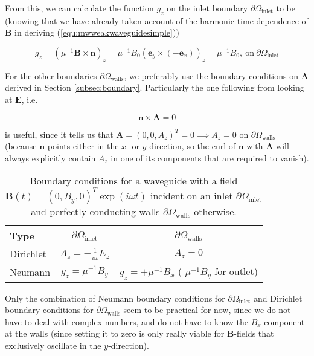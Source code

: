 \documentclass[11pt, a4paper]{article}
\begin{document}
From this, we can calculate the function $g_z$ on the inlet boundary $\partial \Omega_{\text{inlet}}$ to be 
(knowing that we have already taken account of the harmonic time-dependence of 
$\mathbf{B}$ in deriving (\ref{equ:mwweakwaveguidesimple}))

\begin{equation}
    g_z = (\mu^{-1} \mathbf{B} \times \mathbf{n})_z = \mu^{-1} B_0 (\mathbf{e}_y \times (-\mathbf{e}_x))_z = \mu^{-1} B_0, ~\text{on}~\partial \Omega_{\text{inlet}}
\end{equation}

For the other boundaries $\partial \Omega_{\text{walls}}$, we preferably use the boundary
conditions on $\mathbf{A}$ derived in Section \ref{subsec:boundary}. Particularly 
the one following from looking at $\mathbf{E}$, i.e.

\begin{equation}
    \mathbf{n} \times \mathbf{A} = 0
\end{equation}

is useful, since it tells us that $\mathbf{A} = (0, 0, A_z)^T = 0 \implies A_z = 0$
on $\partial \Omega_{\text{walls}}$ (because $\mathbf{n}$ points either in the $x$- or
$y$-direction, so the curl of $\mathbf{n}$ with $\mathbf{A}$ will always explicitly 
contain $A_z$ in one of its components that are required to vanish).

\begin{table}[h]
    \caption{Boundary conditions for a waveguide with a field $\mathbf{B}(t) = (0, B_y, 0)^T \exp(i \omega t)$
    incident on an inlet $\partial \Omega_{\text{inlet}}$ and perfectly conducting 
    walls  $\partial \Omega_{\text{walls}}$ otherwise.}
    \label{tab:label}
    \centering
    \renewcommand{\arraystretch}{1.2}
    \begin{tabular}{@{}lcc@{}}
        \toprule
        Type & $\partial \Omega_{\text{inlet}}$ & $\partial \Omega_{\text{walls}}$ \\
        \midrule
        Dirichlet & $A_z = -\frac{1}{i\omega} E_z$ & $A_z = 0$  \\
        Neumann & $g_z = \mu^{-1} B_y$ & $g_z = \pm \mu^{-1} B_x$ (-$\mu^{-1} B_y$ for outlet) \\
        \bottomrule
    \end{tabular}
\end{table}

Only the combination of Neumann boundary conditions for $\partial \Omega_{\text{inlet}}$
and Dirichlet boundary conditions for $\partial \Omega_{\text{walls}}$ seem to be practical
for now, since we do not have to deal with complex numbers, and do not have to know 
the $B_x$ component at the walls (since setting it to zero is only really viable
for $\mathbf{B}$-fields that exclusively oscillate in the $y$-direction).
\end{document}

